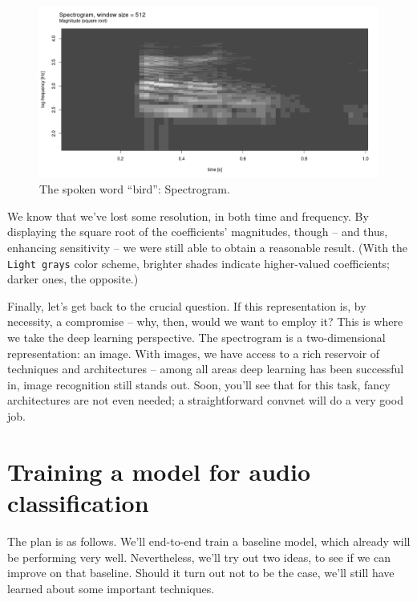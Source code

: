 \documentclass[
  letterpaper,
]{krantz}
\begin{document}
\begin{figure}[H]

{\centering \includegraphics{images/audio-spectrogram.png}

}

\caption{\label{fig-audio-spectrogram}The spoken word ``bird'':
Spectrogram.}

\end{figure}

We know that we've lost some resolution, in both time and frequency. By
displaying the square root of the coefficients' magnitudes, though --
and thus, enhancing sensitivity -- we were still able to obtain a
reasonable result. (With the \texttt{Light\ grays} color scheme,
brighter shades indicate higher-valued coefficients; darker ones, the
opposite.)

Finally, let's get back to the crucial question. If this representation
is, by necessity, a compromise -- why, then, would we want to employ it?
This is where we take the deep learning perspective. The spectrogram is
a two-dimensional representation: an image. With images, we have access
to a rich reservoir of techniques and architectures -- among all areas
deep learning has been successful in, image recognition still stands
out. Soon, you'll see that for this task, fancy architectures are not
even needed; a straightforward convnet will do a very good job.

\hypertarget{training-a-model-for-audio-classification}{%
\section{Training a model for audio
classification}\label{training-a-model-for-audio-classification}}

The plan is as follows. We'll end-to-end train a baseline model, which
already will be performing very well. Nevertheless, we'll try out two
ideas, to see if we can improve on that baseline. Should it turn out not
to be the case, we'll still have learned about some important
techniques.
\end{document}
